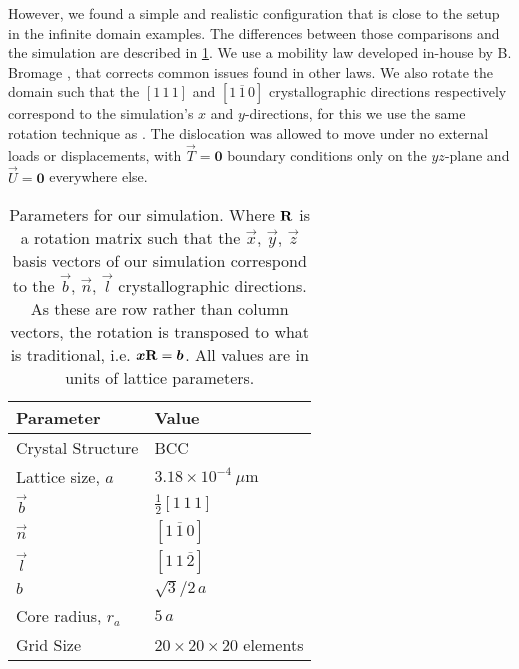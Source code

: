 However, we found a simple and realistic configuration that is close to the setup in the infinite domain examples. The differences between those comparisons and the simulation are described in \cref{t:simulation_params}. We use a mobility law developed in-house by B. Bromage \cite{bromage2018calculating}, that corrects common issues found in other laws. We also rotate the domain such that the $[1\, 1\, 1]$ and $[1\, \overline{1}\, 0]$ crystallographic directions respectively correspond to the simulation's $x$ and $y$-directions, for this we use the same rotation technique as \cite{YU2018}. The dislocation was allowed to move under no external loads or displacements, with $\vec{T} = \bm{0}$ boundary conditions only on the $yz$-plane and $\vec{U} = \bm{0}$ everywhere else.
\begin{table}
  \centering
  \caption[Numeric v.s. analytic tractions. Unloaded simulation comparison.]{Parameters for our simulation. Where $\mathbf{R}$ is a rotation matrix such that the $\vec{x},\, \vec{y},\, \vec{z}$ basis vectors of our simulation correspond to the $\vec{b},\, \vec{n},\, \vec{l}$ crystallographic directions. As these are row rather than column vectors, the rotation is transposed to what is traditional, i.e. $\vec{x}\mtx{R} = \vec{b}$. All values are in units of lattice parameters.}
  \label{t:simulation_params}
  \begin{tabular}{ll}
    \toprule
    Parameter                & Value                                                     \\
    \midrule
    Crystal Structure        & BCC                                                       \\
    Lattice size, $a$        & $3.18\times 10^{-4}~\mu\text{m}$                          \\
    $\vec{b}$                & $\frac{1}{2}[1\, 1\, 1]$                                  \\
    $\vec{n}$                & $[1\, \overline{1}\, 0]$                                  \\
    $\vec{l}$                & $[1\, 1\, \overline{2}]$                                  \\
    $b$                      & $\sqrt{3}/2\, a$                                          \\
    Core radius, $r_a$       & $5\, a$                                                   \\
    Grid Size                & $20 \times 20 \times 20$ elements                         \\

\end{tabular}
\end{table}
